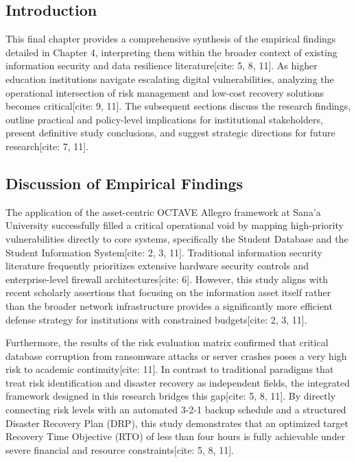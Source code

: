 \documentclass[journal,onecolumn,12pt,twoside]{IEEEtran}
\begin{document}
	\subsection{Introduction}
	\label{subsec:discussion_intro}
	This final chapter provides a comprehensive synthesis of the empirical findings detailed in Chapter 4, interpreting them within the broader context of existing information security and data resilience literature[cite: 5, 8, 11]. As higher education institutions navigate escalating digital vulnerabilities, analyzing the operational intersection of risk management and low-cost recovery solutions becomes critical[cite: 9, 11]. The subsequent sections discuss the research findings, outline practical and policy-level implications for institutional stakeholders, present definitive study conclusions, and suggest strategic directions for future research[cite: 7, 11].
	
	\subsection{Discussion of Empirical Findings}
	\label{subsec:discussion_findings}
	The application of the asset-centric OCTAVE Allegro framework at Sana'a University successfully filled a critical operational void by mapping high-priority vulnerabilities directly to core systems, specifically the Student Database and the Student Information System[cite: 2, 3, 11]. Traditional information security literature frequently prioritizes extensive hardware security controls and enterprise-level firewall architectures[cite: 6]. However, this study aligns with recent scholarly assertions that focusing on the information asset itself rather than the broader network infrastructure provides a significantly more efficient defense strategy for institutions with constrained budgets[cite: 2, 3, 11]. 
	
	Furthermore, the results of the risk evaluation matrix confirmed that critical database corruption from ransomware attacks or server crashes poses a very high risk to academic continuity[cite: 11]. In contrast to traditional paradigms that treat risk identification and disaster recovery as independent fields, the integrated framework designed in this research bridges this gap[cite: 5, 8, 11]. By directly connecting risk levels with an automated 3-2-1 backup schedule and a structured Disaster Recovery Plan (DRP), this study demonstrates that an optimized target Recovery Time Objective (RTO) of less than four hours is fully achievable under severe financial and resource constraints[cite: 5, 8, 11].
	
\end{document}
